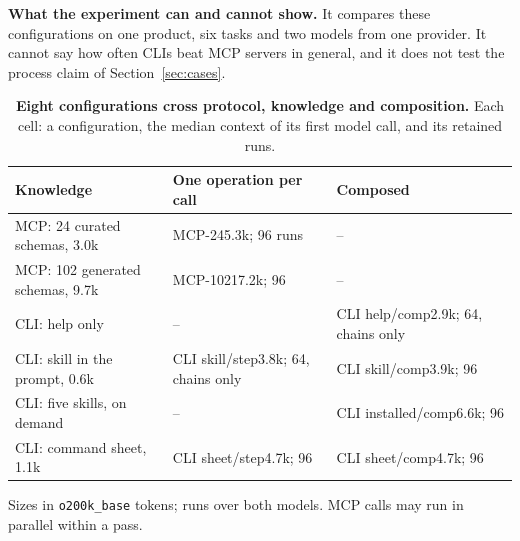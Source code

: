 \documentclass[sigconf,nonacm]{acmart}
\newcommand{\cfg}[1]{\textsf{#1}}
\newcommand{\finding}[1]{\textbf{#1}}
\begin{document}
\finding{What the experiment can and cannot show.} It compares these configurations on one product, six tasks and two models from one provider. It cannot say how often CLIs beat MCP servers in general, and it does not test the process claim of Section~\ref{sec:cases}.

\begin{table}[t]
\caption{\textbf{Eight configurations cross protocol, knowledge and composition.} Each cell: a configuration, the median context of its first model call, and its retained runs.}
\label{tab:arms}
\footnotesize
\setlength{\tabcolsep}{3pt}
\begin{tabular}{@{}>{\raggedright\arraybackslash}p{2.7cm}>{\raggedright\arraybackslash}p{2.5cm}>{\raggedright\arraybackslash}p{2.5cm}@{}}
\toprule
\textbf{Knowledge} & \textbf{One operation per call} & \textbf{Composed} \\
\midrule
MCP: 24 curated schemas, 3.0k & \textcolor{mcpc}{\cfg{MCP-24}}\newline 5.3k; 96 runs & -- \\
MCP: 102 generated schemas, 9.7k & \textcolor{mcpc}{\cfg{MCP-102}}\newline 17.2k; 96 & -- \\
\midrule
CLI: help only & -- & \textcolor{clic}{\cfg{CLI help/comp}}\newline 2.9k; 64, chains only \\
CLI: skill in the prompt, 0.6k & \textcolor{clic}{\cfg{CLI skill/step}}\newline 3.8k; 64, chains only & \textcolor{clic}{\cfg{CLI skill/comp}}\newline 3.9k; 96 \\
CLI: five skills, on demand & -- & \textcolor{clic}{\cfg{CLI installed/comp}}\newline 6.6k; 96 \\
CLI: command sheet, 1.1k & \textcolor{clic}{\cfg{CLI sheet/step}}\newline 4.7k; 96 & \textcolor{clic}{\cfg{CLI sheet/comp}}\newline 4.7k; 96 \\
\bottomrule
\end{tabular}

\smallskip\footnotesize Sizes in \texttt{o200k\_base} tokens; runs over both models. MCP calls may run in parallel within a pass.
\end{table}
\end{document}
